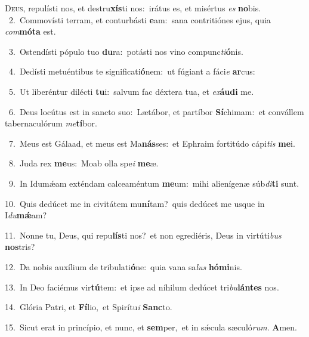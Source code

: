 \lettrine{\initial\textcolor{\initialcolor}{D}}{eus,} repulísti nos, et destru\-\textbf{xís}\-ti nos:~\star irátus es, et misértus \textit{es} \textbf{no}\-bis.\\
{\numbfont\textcolor{\numbcolor}{~2.}}~Commovísti terram, et conturbásti \textbf{e}\-am:~\star sana contritiónes ejus, quia \textit{com}\-\textbf{mó}\textbf{ta} est.\par
{\numbfont\textcolor{\numbcolor}{~3.}}~Ostendísti pópulo tuo \textbf{du}\-ra:~\star potásti nos vino compunc\-\textit{ti}\-\textbf{ó}nis.\par
{\numbfont\textcolor{\numbcolor}{~4.}}~Dedísti metuéntibus te significati\-\textbf{ó}\-nem:~\star ut fúgiant a fáci\textit{e} \textbf{ar}\-cus:\par
{\numbfont\textcolor{\numbcolor}{~5.}}~Ut liberéntur dilécti \textbf{tu}\-i:~\star salvum fac déxtera tua, et \textit{ex}\-\textbf{áu}\textbf{di} me.\par
{\numbfont\textcolor{\numbcolor}{~6.}}~Deus locútus est in sancto suo:~\dagger Lætábor, et partíbor \textbf{Sí}\-chimam:~\star et convállem tabernaculórum \textit{me}\-\textbf{tí}bor.\par
{\numbfont\textcolor{\numbcolor}{~7.}}~Meus est Gálaad, et meus est Ma\-\textbf{nás}\-ses:~\star et Ephraim fortitúdo cápi\textit{tis} \textbf{me}\-i.\par
{\numbfont\textcolor{\numbcolor}{~8.}}~Juda rex \textbf{me}\-us:~\star Moab olla spe\textit{i} \textbf{me}\-æ.\par
{\numbfont\textcolor{\numbcolor}{~9.}}~In Idumǽam exténdam calceaméntum \textbf{me}\-um:~\star mihi alienígenæ súb\-\textit{di}\-\textbf{ti} sunt.\par
{\numbfont\textcolor{\numbcolor}{10.}}~Quis dedúcet me in civitátem mu\-\textbf{ní}\-tam?~\star quis dedúcet me usque in I\-\textit{du}\-\textbf{mǽ}am?\par
{\numbfont\textcolor{\numbcolor}{11.}}~Nonne tu, Deus, qui repu\-\textbf{lís}\-ti nos?~\star et non egrediéris, Deus in virtúti\textit{bus} \textbf{nos}\-tris?\par
{\numbfont\textcolor{\numbcolor}{12.}}~Da nobis auxílium de tribulati\-\textbf{ó}\-ne:~\star quia vana sa\textit{lus} \textbf{hó}\-\textbf{mi}nis.\par
{\numbfont\textcolor{\numbcolor}{13.}}~In Deo faciémus vir\-\textbf{tú}\-tem:~\star et ipse ad níhilum dedúcet tri\-\textit{bu}\-\textbf{lán}\textbf{tes} nos.\par
{\numbfont\textcolor{\numbcolor}{14.}}~Glória Patri, et \textbf{Fí}\-lio,~\star et Spirítu\textit{i} \textbf{Sanc}\-to.\par
{\numbfont\textcolor{\numbcolor}{15.}}~Sicut erat in princípio, et nunc, et \textbf{sem}\-per,~\star et in sǽcula sæculó\-\textit{rum}\-. \textbf{A}\-men.\par
